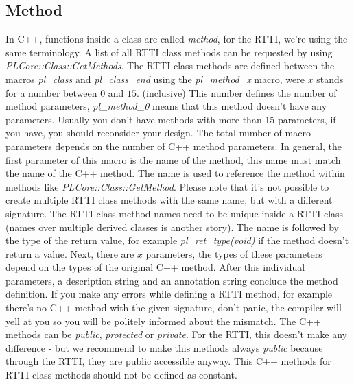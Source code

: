 \subsection{Method}
\label{ClassMembers:Method}
In C++, functions inside a class are called \emph{method}, for the RTTI, we're using the same terminology. A list of all RTTI class methods can be requested by using \emph{PLCore::Class::GetMethods}. The RTTI class methods are defined between the macros \emph{pl\_class} and \emph{pl\_class\_end} using the \emph{pl\_method\_x} macro, were $x$ stands for a number between $0$ and $15$. (inclusive) This number defines the number of method parameters, \emph{pl\_method\_0} means that this method doesn't have any parameters. Usually you don't have methods with more than 15 parameters, if you have, you should reconsider your design. The total number of macro parameters depends on the number of C++ method parameters. In general, the first parameter of this macro is the name of the method, this name must match the name of the C++ method. The name is used to reference the method within methods like \emph{PLCore::Class::GetMethod}. Please note that it's not possible to create multiple RTTI class methods with the same name, but with a different signature. The RTTI class method names need to be unique inside a RTTI class (names over multiple derived classes is another story). The name is followed by the type of the return value, for example \emph{pl\_ret\_type(void)} if the method doesn't return a value. Next, there are $x$ parameters, the types of these parameters depend on the types of the original C++ method. After this individual parameters, a description string and an annotation string conclude the method definition. If you make any errors while defining a RTTI method, for example there's no C++ method with the given signature, don't panic, the compiler will yell at you so you will be politely informed about the mismatch. The C++ methods can be \emph{public}, \emph{protected} or \emph{private}. For the RTTI, this doesn't make any difference - but we recommend to make this methods always \emph{public} because through the RTTI, they are public accessible anyway. This C++ methods for RTTI class methods should not be defined as constant.

